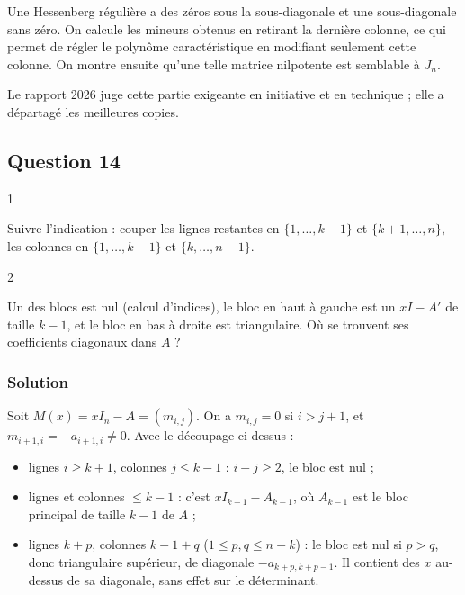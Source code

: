 \documentclass[11pt,a4paper]{article}
\providecommand{\tightlist}{\setlength{\itemsep}{0pt}\setlength{\parskip}{0pt}}
\begin{document}
Une Hessenberg régulière a des zéros sous la sous-diagonale et une sous-diagonale sans zéro. On calcule les mineurs obtenus en retirant la dernière colonne, ce qui permet de régler le polynôme caractéristique en modifiant seulement cette colonne. On montre ensuite qu'une telle matrice nilpotente est semblable à \(J_n\).

Le rapport 2026 juge cette partie exigeante en initiative et en technique ; elle a départagé les meilleures copies.

\hypertarget{question-14}{%
\subsection{Question 14}\label{question-14}}

\begin{indication}{1}

Suivre l'indication : couper les lignes restantes en \(\{1,\dots,k-1\}\) et \(\{k+1,\dots,n\}\), les colonnes en \(\{1,\dots,k-1\}\) et \(\{k,\dots,n-1\}\).

\end{indication}

\begin{indication}{2}

Un des blocs est nul (calcul d'indices), le bloc en haut à gauche est un \(xI-A'\) de taille \(k-1\), et le bloc en bas à droite est triangulaire. Où se trouvent ses coefficients diagonaux dans \(A\) ?

\end{indication}

\hypertarget{solution-13}{%
\subsubsection{Solution}\label{solution-13}}

Soit \(M(x)=xI_n-A=(m_{i,j})\). On a \(m_{i,j}=0\) si \(i>j+1\), et \(m_{i+1,i}=-a_{i+1,i}\neq0\). Avec le découpage ci-dessus :

\begin{itemize}
\tightlist
\item
  lignes \(i\geqslant k+1\), colonnes \(j\leqslant k-1\) : \(i-j\geqslant2\), le bloc est nul ;
\item
  lignes et colonnes \(\leqslant k-1\) : c'est \(xI_{k-1}-A_{k-1}\), où \(A_{k-1}\) est le bloc principal de taille \(k-1\) de \(A\) ;
\item
  lignes \(k+p\), colonnes \(k-1+q\) (\(1\leqslant p,q\leqslant n-k\)) : le bloc est nul si \(p>q\), donc triangulaire supérieur, de diagonale \(-a_{k+p,k+p-1}\). Il contient des \(x\) au-dessus de sa diagonale, sans effet sur le déterminant.
\end{itemize}
\end{document}
